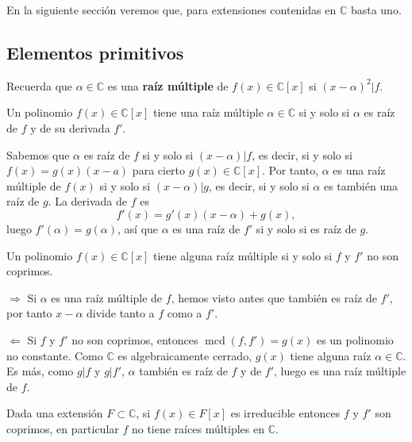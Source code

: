 En la siguiente sección veremos que, para extensiones contenidas en
\(\mathbb{C}\) basta uno.

\hypertarget{elementos-primitivos}{%
\subsection{Elementos primitivos}\label{elementos-primitivos}}

Recuerda que \(\alpha\in\mathbb{C}\) es una \textbf{raíz múltiple} de
\(f(x)\in\mathbb{C}[x]\) si \((x-\alpha)^2|f\).


Un polinomio \(f(x)\in\mathbb{C}[x]\) tiene una raíz múltiple
\(\alpha\in\mathbb{C}\) si y solo si \(\alpha\) es raíz de \(f\) y de su
derivada \(f'\). 


Sabemos que \(\alpha\) es raíz de \(f\) si y solo si \((x-\alpha)|f\),
es decir, si y solo si \(f(x)=g(x)(x-a)\) para cierto
\(g(x)\in\mathbb{C}[x]\). Por tanto, \(\alpha\) es una raíz múltiple de
\(f(x)\) si y solo si \((x-\alpha)|g\), es decir, si y solo si
\(\alpha\) es también una raíz de \(g\). La derivada de \(f\) es
\[f'(x)=g'(x)(x-\alpha)+g(x),\] luego \(f'(\alpha)=g(\alpha)\), así que
\(\alpha\) es una raíz de \(f'\) si y solo si es raíz de \(g\).


Un polinomio \(f(x)\in\mathbb{C}[x]\) tiene alguna raíz múltiple si y
solo si \(f\) y \(f'\) no son coprimos. 


\(\Rightarrow\) Si \(\alpha\) es una raíz múltiple de \(f\), hemos visto
antes que también es raíz de \(f'\), por tanto \(x-\alpha\) divide tanto
a \(f\) como a \(f'\).

\(\Leftarrow\) Si \(f\) y \(f'\) no son coprimos, entonces
\(\operatorname{mcd}(f,f')=g(x)\) es un polinomio no constante. Como
\(\mathbb{C}\) es algebraicamente cerrado, \(g(x)\) tiene alguna raíz
\(\alpha\in\mathbb{C}\). Es más, como \(g|f\) y \(g|f'\), \(\alpha\)
también es raíz de \(f\) y de \(f'\), luego es una raíz múltiple de
\(f\). 


Dada una extensión \(F\subset\mathbb{C}\), si \(f(x)\in F[x]\) es
irreducible entonces \(f\) y \(f'\) son coprimos, en particular \(f\) no
tiene raíces múltiples en \(\mathbb{C}\). 


